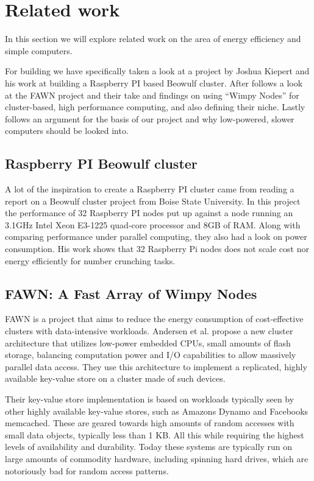\clearpage
\section{Related work}
\label{sec:related}
In this section we will explore related work on the area of energy efficiency and simple computers. 

For building we have specifically taken a look at a project by Joshua Kiepert and his work at building a Raspberry PI based Beowulf cluster\cite{RPI_BEOWULF}.
After follows a look at the FAWN project and their take and findings on using ``Wimpy Nodes'' for cluster-based, high performance computing, and also defining their niche.
Lastly follows an argument for the basis of our project and why low-powered, slower computers should be looked into.

\subsection{Raspberry PI Beowulf cluster}
A lot of the inspiration to create a Raspberry PI cluster came from reading a report on a Beowulf cluster project from Boise State University.\cite{RPI_BEOWULF} In this project the performance of 32 Raspberry PI nodes put up against a node running an 3.1GHz Intel Xeon E3-1225 quad-core processor and 8GB of RAM.
Along with comparing performance under parallel computing, they also had a look on power consumption. His work shows that 32 Raspberry Pi nodes does not scale cost nor energy efficiently for number crunching tasks.  

\subsection{FAWN: A Fast Array of Wimpy Nodes}
FAWN\cite{fawn} is a project that aims to reduce the energy consumption of cost-effective clusters with data-intensive workloads. 
Andersen et al. propose a new cluster architecture that utilizes low-power embedded CPUs, small amounts of flash storage, balancing computation power and I/O capabilities to allow massively parallel data access.
They use this architecture to implement a replicated, highly available key-value store on a cluster made of such devices.

Their key-value store implementation is based on workloads typically seen by other highly available key-value stores, such as Amazons Dynamo and Facebooks memcached. These are geared towards high amounts of random accesses with small data objects, typically less than 1 KB. All this while requiring the highest levels of availability and durability.
Today these systems are typically run on large amounts of commodity hardware, including spinning hard drives, which are notoriously bad for random access patterns.

